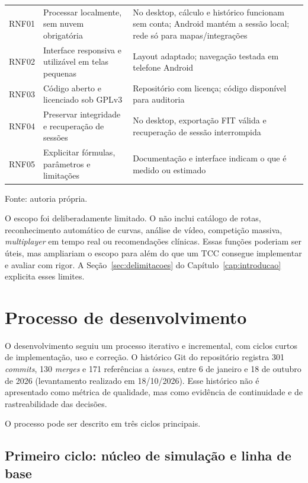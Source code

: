 \begin{table}[htbp]
\begin{tabular}{
        >{\raggedright\arraybackslash}p{1.4cm}
        >{\raggedright\arraybackslash}p{7.4cm}
        >{\raggedright\arraybackslash}p{5.4cm}
    }
        RNF01 & Processar localmente, sem nuvem obrigatória &
        No desktop, cálculo e histórico funcionam sem conta; Android mantém a
        sessão local; rede só para mapas/integrações \\
        RNF02 & Interface responsiva e utilizável em telas pequenas &
        Layout adaptado; navegação testada em telefone Android \\
        RNF03 & Código aberto e licenciado sob GPLv3 &
        Repositório com licença; código disponível para auditoria \\
        RNF04 & Preservar integridade e recuperação de sessões &
        No desktop, exportação FIT válida e recuperação de sessão interrompida \\
        RNF05 & Explicitar fórmulas, parâmetros e limitações &
        Documentação e interface indicam o que é medido ou estimado \\
        \bottomrule
    \end{tabular}
    \vspace{0.2cm}
    \par\small Fonte: autoria própria.
\end{table}

O escopo foi deliberadamente limitado. O \argus{} não inclui catálogo de rotas,
reconhecimento automático de curvas, análise de vídeo, competição massiva,
\textit{multiplayer} em tempo real ou recomendações clínicas. Essas funções
poderiam ser úteis, mas ampliariam o escopo para além do que um TCC consegue
implementar e avaliar com rigor. A Seção~\ref{sec:delimitacoes} do
Capítulo~\ref{cap:introducao} explicita esses limites.

\section{Processo de desenvolvimento}
\label{sec:processo-desenvolvimento}

O desenvolvimento seguiu um processo iterativo e incremental, com ciclos curtos
de implementação, uso e correção. O histórico Git do repositório registra 301
\textit{commits}, 130 \textit{merges} e 171 referências a \textit{issues}, entre
6 de janeiro e 18 de outubro de 2026 (levantamento realizado em 18/10/2026).
Esse histórico não é apresentado como métrica de qualidade, mas como evidência
de continuidade e de rastreabilidade das decisões.

O processo pode ser descrito em três ciclos principais.

\subsection{Primeiro ciclo: núcleo de simulação e linha de base}
\label{sec:primeiro-ciclo}

